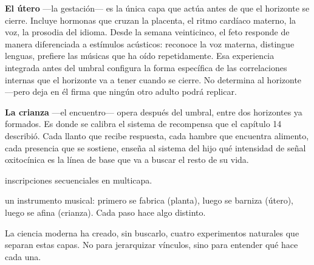\textbf{El útero} —la gestación— es la única capa que actúa antes de que el horizonte se cierre. Incluye hormonas que cruzan la placenta, el ritmo cardíaco materno, la voz, la prosodia del idioma. Desde la semana veinticinco, el feto responde de manera diferenciada a estímulos acústicos: reconoce la voz materna, distingue lenguas, prefiere las músicas que ha oído repetidamente. Esa experiencia integrada antes del umbral configura la forma específica de las correlaciones internas que el horizonte va a tener cuando se cierre. No determina al horizonte —pero deja en él firma que ningún otro adulto podrá replicar.

\textbf{La crianza} —el encuentro— opera después del umbral, entre dos horizontes ya formados. Es donde se calibra el sistema de recompensa que el capítulo 14 describió. Cada llanto que recibe respuesta, cada hambre que encuentra alimento, cada presencia que se sostiene, enseña al sistema del hijo qué intensidad de señal oxitocínica es la línea de base que va a buscar el resto de su vida.

\begin{fisica}
 inscripciones secuenciales en multicapa.

 un instrumento musical: primero se fabrica (planta), luego se barniza (útero), luego se afina (crianza). Cada paso hace algo distinto.
\end{fisica}
\noindent La ciencia moderna ha creado, sin buscarlo, cuatro experimentos naturales que separan estas capas. No para jerarquizar vínculos, sino para entender qué hace cada una.

